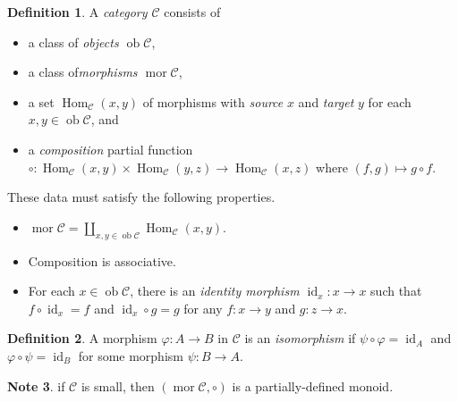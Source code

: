 \documentclass[10pt,letterpaper,cm]{nupset}
\theoremstyle{definition}
\newtheorem{definition}{Definition}[subsection]
\newtheorem{note}[definition]{Note}
\theoremstyle{theorem}
\theoremstyle{remark}
\newcommand{\1}{\mathbf{1}}
\renewcommand{\c}{\mathscr{C}}
\newcommand{\0}{\vec 0}
\DeclareMathOperator{\id}{id}
\DeclareMathOperator{\mor}{mor}
\DeclareMathOperator{\ob}{ob}
\DeclareMathOperator{\Hom}{Hom}
\begin{document}
\begin{definition} 
A \textit{category $\c$} consists of
\begin{itemize}
\item a class of \textit{objects $\ob{\c}$},
\item a class of\textit{morphisms $\mor{\c}$},
\item a set $\Hom_{\c}(x,y)$ of morphisms with \textit{source} $x$ and \textit{target} $y$ for each $x,y \in \ob{\c}$, and
\item a \textit{composition} partial function $\circ : \Hom_{\c}(x,y) \times \Hom_{\c}(y,z) \to \Hom_{\c}(x,z)$ where $(f,g) \mapsto g \circ f$.
\end{itemize}
These data must satisfy the following properties.
\begin{itemize}
\item $\mor{\c} = \coprod_{x,y\in \ob{\c}} \Hom_{\c}(x,y)$.
\item Composition is associative.
\item For each $x\in \ob{\c}$, there is an \textit{identity morphism $\id_x: x \to x$} such that $f \circ \id_x = f$ and $\id_x \circ g = g$ for any $f: x \to y$ and $g: z \to x$.
\end{itemize}
\end{definition}

\begin{definition}
A morphism $\varphi : A \to B$ in $\c$ is an \textit{isomorphism} if $\psi \circ \varphi = \id_A$ and $\varphi \circ \psi = \id_B$ for some morphism $\psi : B \to A$.
\end{definition}

\begin{note}
if $\c$ is small, then $(\mor \c, \circ)$ is a partially-defined monoid.
\end{note}
\end{document}
